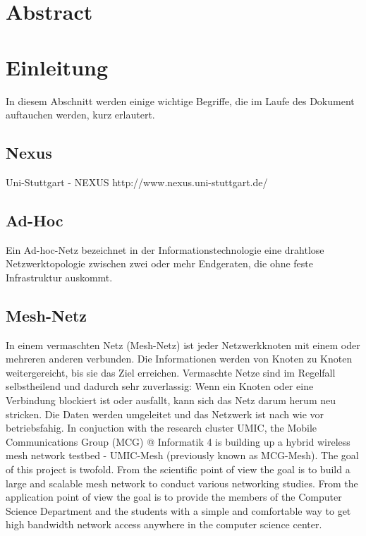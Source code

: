 \section{Abstract}


\section{Einleitung}

In diesem Abschnitt werden einige wichtige Begriffe, die im Laufe des
Dokument auftauchen werden, kurz erlautert.

\subsection{Nexus}

Uni-Stuttgart - NEXUS 
 http://www.nexus.uni-stuttgart.de/
 
\subsection{Ad-Hoc}

Ein Ad-hoc-Netz bezeichnet in der Informationstechnologie eine drahtlose
Netzwerktopologie zwischen zwei oder mehr Endgeraten, die ohne feste
Infrastruktur auskommt.


\subsection{Mesh-Netz}

In einem vermaschten Netz (Mesh-Netz) ist jeder Netzwerkknoten mit einem
oder mehreren anderen verbunden. Die Informationen werden von Knoten
zu Knoten weitergereicht, bis sie das Ziel erreichen. Vermaschte
Netze sind im Regelfall selbstheilend und dadurch sehr zuverlassig:
Wenn ein Knoten oder eine Verbindung blockiert ist oder ausfallt, kann
sich das Netz darum herum neu stricken. Die Daten werden umgeleitet und
das Netzwerk ist nach wie vor betriebsfahig. In conjuction with the
research cluster UMIC, the Mobile Communications Group (MCG) @ Informatik
4 is building up a hybrid wireless mesh network testbed - UMIC-Mesh
(previously known as MCG-Mesh). The goal of this project is twofold. From
the scientific point of view the goal is to build a large and scalable
mesh network to conduct various networking studies. From the application
point of view the goal is to provide the members of the Computer Science
Department and the students with a simple and comfortable way to get
high bandwidth network access anywhere in the computer science center.

